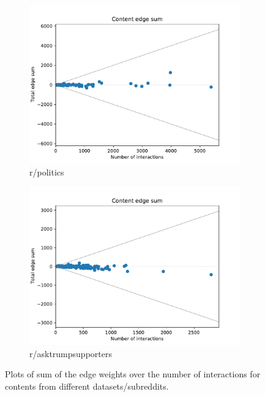 \begin{figure}
\begin{center}
		\begin{subfigure}[b]{0.4\textwidth}
			\centering
			\includegraphics[width=\textwidth]{tex/out/politics200/edge-sum-n-interactions.pdf}
			\caption{r/politics}
			\label{fig:tex/out/politics200/edge-sum-n-interactions.pdf}
		\end{subfigure}
		\begin{subfigure}[b]{0.4\textwidth}
			\centering
			\includegraphics[width=\textwidth]{tex/out/asktrumpsupporters200/edge-sum-n-interactions.pdf}
			\caption{r/asktrumpsupporters}
			\label{fig:tex/out/covid19200/edge-sum-n-interactions.pdf}
		\end{subfigure}
	\end{center}
	\caption[Sum edges over number of interactions for many datasets]{Plots of
		sum of the edge weights over the number of interactions for contents
		from different datasets/subreddits.}
	\label{fig:edge-sum-n-interactions}
\end{figure}

